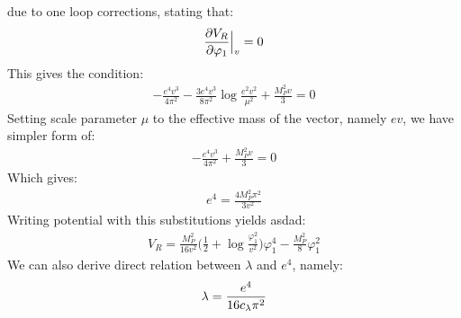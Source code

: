 due to one loop corrections, stating that:
\begin{align}
\frac{\partial V_R}{\partial \varphi_1} \Big|_v= 0
\end{align}
This gives the condition:
\begin{align}
-\frac{e^4v^3}{4\pi^2}-\frac{3e^4v^3}{8\pi^2}\log\frac{e^2v^2}{\mu^2}+\frac{M_P^2v}{3}=0
\end{align}
Setting scale parameter $\mu$ to the effective mass of the vector, namely $ev$, we have 
simpler form of:
\begin{align}
-\frac{e^4v^3}{4\pi^2}+\frac{M_P^2v}{3}=0
\end{align}
Which gives:
\begin{align}
e^4 = \frac{4M_P^2\pi^2}{3v^2}
\end{align}
Writing potential with this substitutions yields asdad:
\begin{align}
V_R = \frac{M_P^2}{16v^2}\Big(\frac{1}{2}+\log\frac{\varphi_1^2}{v^2}\Big)\varphi_1^4- 
\frac{M_P^2}{8}\varphi_1^2
\end{align}
We can also derive direct relation between $\lambda$ and $e^4$, namely:
\begin{align}
\lambda = \frac{e^4}{16c_\lambda\pi^2}
\end{align}

